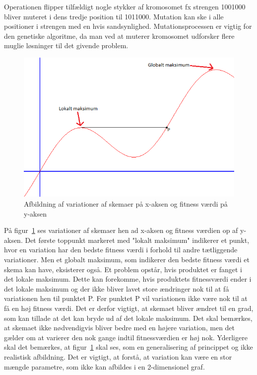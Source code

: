 Operationen flipper tilfældigt nogle stykker af kromosomet fx strengen 1001000 bliver muteret i dens tredje position til 1011000. Mutation kan ske i alle positioner i strengen med en hvis sandsynlighed. Mutationsprocessen er vigtig for den genetiske algoritme, da man ved at muterer kromosomet udforsker flere muglie løsninger til det givende problem.
\begin{figure}[!h]
  \includegraphics[width=\textwidth]{partials/graphics/lokaltmaksimum.png}
  \caption{Afbildning af variationer af skemaer på x-aksen og fitness værdi på y-aksen}
  \label{fig:Lokalmax}
\end{figure}

På figur~\ref{fig:Lokalmax} ses variationer af skemaer hen ad x-aksen og fitness værdien op af y-aksen. Det første toppunkt markeret med "lokalt maksimum" indikerer et punkt, hvor en variation har den bedste fitness værdi i forhold til andre tætliggende variationer. Men et globalt maksimum, som indikerer den bedste fitness værdi et skema kan have, eksisterer også. Et problem opstår, hvis produktet er fanget i det lokale maksimum. Dette kan forekomme, hvis produktets fitnessværdi ender i det lokale maksimum og der ikke bliver lavet store ændringer nok til at få variationen hen til punktet P. Før punktet P vil variationen ikke være nok til at få en høj fitness værdi. Det er derfor vigtigt, at skemaet bliver ændret til en grad, som kan tillade at det kan bryde ud af det lokale maksimum. Det skal bemærkes, at skemaet ikke nødvendigvis bliver bedre med en højere variation, men det gælder om at varierer den nok gange indtil fitnessværdien er høj nok. Yderligere skal det bemærkes, at figur~\ref{fig:Lokalmax} skal ses, som en generalisering af princippet og ikke realistisk afbildning. Det er vigtigt, at forstå, at variation kan være en stor mængde parametre, som ikke kan afbildes i en 2-dimensionel graf.


